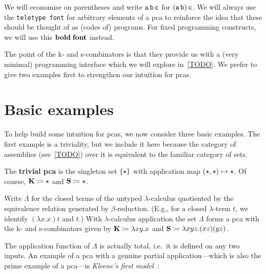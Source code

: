 \begin{notation}
  We will economise on parentheses and write \(\operatorname{\mathtt{a}}\operatorname{\mathtt{b}}\operatorname{\mathtt{c}}\) for
  \((\operatorname{\mathtt{a}}\operatorname{\mathtt{b}})\operatorname{\mathtt{c}}\).
  We will always use the \texttt{teletype font} for arbitrary elements of a pca
  to reinforce the idea that these should be thought of as (codes of) programs.
  For fixed programming constructs, we will use this \(\operatorname{\mathbf{bold\; font}}\)
  instead.
\end{notation}

The point of the k- and s-combinators is that they provide us with a (very
minimal) programming interface which we will explore in~\cref{TODO}.
%
We prefer to give two examples first to strengthen our intuition for pcas.

\section{Basic examples}

To help build some intuition for pcas, we now consider three basic examples. The
first example is a triviality, but we include it here because the category of
assemblies (see~\cref{TODO}) over it is equivalent to the familiar category of
sets.

\begin{example}
  The \textbf{trivial pca} is the singleton set \(\{\star\}\) with
  application map \((\star,\star) \mapsto \star\).
  Of course, \(\operatorname{\mathbf{K}} \coloneq \star\) and \(\operatorname{\mathbf{S}} \coloneq \star\).
\end{example}

\begin{example}
  Write \(\Lambda\) for the closed terms of the untyped \(\lambda\)-calculus
  quotiented by the equivalence relation generated by
  \(\beta\)-reduction. (E.g., for a closed \(\lambda\)-term \(t\), we identify
  \((\lambda{x}.{x})t\) and \(t\).)
  With \(\lambda\)-calculus application the set \(\Lambda\) forms a pca with the
  k- and s-combinators given by \(\operatorname{\mathbf{K}} \coloneq \lambda{xy}.x\) and
  \(\operatorname{\mathbf{S}} \coloneq \lambda{xyz}.(xz)(yz)\).
\end{example}

The application function of \(\Lambda\) is actually total, i.e.\ it is defined
on any two inputs. An example of a pca with a genuine partial application---which
is also the prime example of a pca---is \emph{Kleene's first model}~\cite{Kleene1945}:

